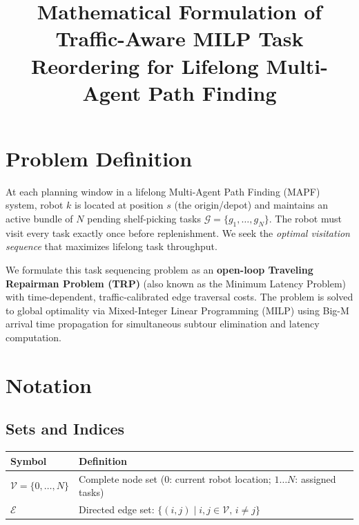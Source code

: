 \documentclass[10pt, twocolumn]{article}
\title{\textbf{Mathematical Formulation of Traffic-Aware MILP Task Reordering for Lifelong Multi-Agent Path Finding}}
\author{}
\date{}
\begin{document}
\maketitle

\section{Problem Definition}

At each planning window in a lifelong Multi-Agent Path Finding (MAPF) system, robot $k$ is located at position $s$ (the origin/depot) and maintains an active bundle of $N$ pending shelf-picking tasks $\mathcal{G} = \{g_1, \ldots, g_N\}$. The robot must visit every task exactly once before replenishment. We seek the \textit{optimal visitation sequence} that maximizes lifelong task throughput.

We formulate this task sequencing problem as an \textbf{open-loop Traveling Repairman Problem (TRP)} (also known as the Minimum Latency Problem) with time-dependent, traffic-calibrated edge traversal costs. The problem is solved to global optimality via Mixed-Integer Linear Programming (MILP) using Big-M arrival time propagation for simultaneous subtour elimination and latency computation.

\section{Notation}

\subsection*{Sets and Indices}
\begin{tabularx}{\columnwidth}{lX}
\toprule
Symbol & Definition \\
\midrule
$\mathcal{V} = \{0,\ldots,N\}$ & Complete node set ($0$: current robot location; $1{\ldots}N$: assigned tasks) \\
$\mathcal{E}$ & Directed edge set: $\{(i,j) \mid i,j \in \mathcal{V},\, i \neq j\}$ \\
\bottomrule
\end{tabularx}
\end{document}
